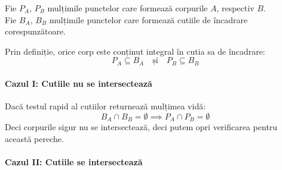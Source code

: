 \documentclass[12pt, a4paper]{article}
\begin{document}
Fie $P_A$, $P_B$ mulțimile punctelor care formează corpurile $A$, respectiv $B$. \\
Fie $B_A$, $B_B$ mulțimile punctelor care formează cutiile de încadrare corespunzătoare.

Prin definiție, orice corp este conținut integral în cutia sa de încadrare:
\begin{equation}
    P_A \subseteq B_A \quad \text{și} \quad P_B \subseteq B_B
\end{equation}

\paragraph{Cazul I: Cutiile nu se intersectează}
Dacă testul rapid al cutiilor returnează mulțimea vidă:
\begin{equation}
    B_A \cap B_B = \emptyset \implies P_A \cap P_B = \emptyset
\end{equation}
Deci corpurile sigur nu se intersectează, deci putem opri verificarea pentru această pereche.

\paragraph{Cazul II: Cutiile se intersectează}
\end{document}
